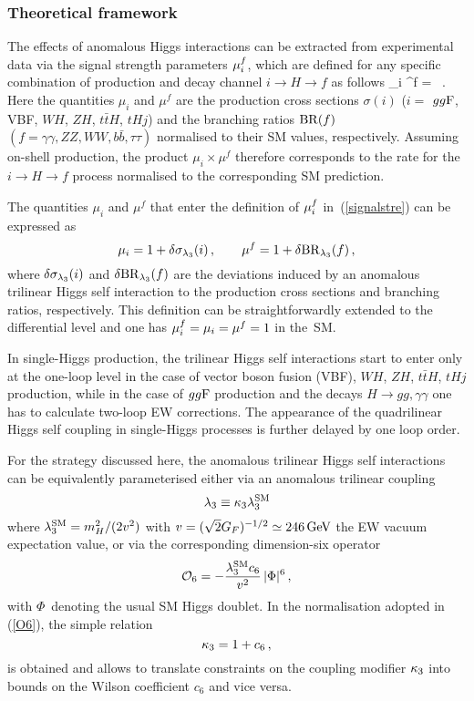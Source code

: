 \subsubsection{Theoretical framework}
\label{tril-single:theo}

The effects of anomalous Higgs interactions can be extracted from experimental data via the signal strength parameters $\mu_i^f$, which
are defined for any specific combination of production and decay channel $i \to H \to f$ as follows 
\beq \label{signalstre}
\muif \equiv \mu_i \times \mu^f =  \times {} \, .
\eeq 
Here the quantities $\mu_i$ and $\mu^f$ are   the production cross sections $\sigma(i)$ ($i=$ $gg{\rm F}$, {\rm VBF}, $WH$, $ZH$, $t \bar tH$, $tHj$) and the branching ratios ${\rm BR}(f)$ $(f= \gamma\gamma, ZZ, WW, b\bar{b}, \tau\tau)$ normalised to their SM values, respectively. Assuming on-shell production, the product $\mu_i \times \mu^f$  therefore corresponds to the rate for the $i \to H \to f$ process  normalised to the corresponding SM prediction.

The quantities $\mu_i$ and $\mu^f$ that enter the definition of  $\mu_i^f$ in~(\ref{signalstre})  can be expressed as
\begin{equation} \label{eq:muf}
\mu_i = 1 + \delta \sigma_{\lambda_{3}}(i) \,,  \qquad 
\mu^f = 1 + \delta {\rm BR}_{\lambda_{3}}(f) \,,
\end{equation}
where $\delta \sigma_{\lambda_{3}}(i)$ and $\delta {\rm BR}_{\lambda_{3}}(f)$ are the deviations induced by an anomalous trilinear Higgs self interaction to the production cross sections and branching ratios, respectively.
This definition can be straightforwardly extended to the differential level and one has $\mu_i^f=\mu_i=\mu^f=1$ in the~SM.

In single-Higgs production, the trilinear Higgs self interactions start to enter only at the one-loop level in the case of vector boson fusion (VBF), $WH$, $ZH$, $t \bar tH$, $tHj$ production, while in the case of $gg{\rm F}$ production and the decays $H\to gg, \gamma \gamma$ one has to calculate two-loop EW corrections. The appearance of the quadrilinear Higgs self coupling in single-Higgs processes is further delayed by one loop order.

For the strategy discussed here, the anomalous trilinear Higgs self interactions can be equivalently parameterised either via an anomalous trilinear coupling  
\begin{equation}
\lambda_{3} \equiv \kappa_{3} \lambda_{3}^{\rm SM}
\end{equation}
where $\lambda_3^{\rm SM} = m_H^2/(2 v^2)$ with $v = (\sqrt{2} G_F)^{-1/2} \simeq 246 \, {\rm GeV}$ the EW vacuum expectation value, or via the corresponding dimension-six operator 
\begin{equation} \label{O6}
{\cal O}_6 = - \frac{\lambda_3^{\rm SM} c_6}{v^2} \, |\Phi|^6  \,,
\end{equation}
with $\Phi$~denoting the usual SM Higgs doublet. In the normalisation adopted in (\ref{O6}), the simple relation 
\begin{equation}
\kappa_{3} = 1 + c_6 \,,
\end{equation}
is obtained and allows to translate constraints on the coupling modifier $\kappa_{3}$ into bounds on the Wilson coefficient $c_6$ and vice versa. 

